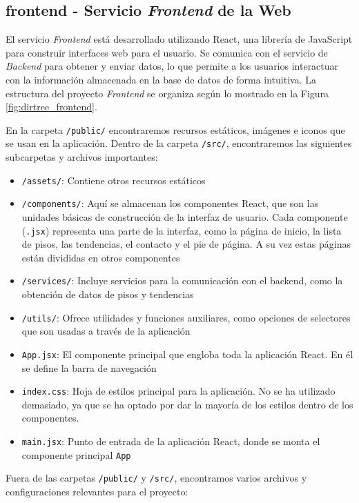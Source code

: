 \subsection{frontend - Servicio \textit{Frontend} de la Web}

El servicio \textit{Frontend} está desarrollado utilizando React, una librería de JavaScript para construir interfaces web para el usuario. Se comunica con el servicio de \textit{Backend} para obtener y enviar datos, lo que permite a los usuarios interactuar con la información almacenada en la base de datos de forma intuitiva. La estructura del proyecto \textit{Frontend} se organiza según lo mostrado en la Figura \ref{fig:dirtree_frontend}.

En la carpeta \texttt{/public/} encontraremos recursos estáticos, imágenes e iconos que se usan en la aplicación. Dentro de la carpeta \texttt{/src/}, encontraremos las siguientes subcarpetas y archivos importantes:

\begin{itemize}
    \item \texttt{/assets/}: Contiene otros recursos estáticos
    \item \texttt{/components/}: Aquí se almacenan los componentes React, que son las unidades básicas de construcción de la interfaz de usuario. Cada componente (\texttt{.jsx}) representa una parte de la interfaz, como la página de inicio, la lista de pisos, las tendencias, el contacto y el pie de página. A su vez estas páginas están divididas en otros componentes
    \item \texttt{/services/}: Incluye servicios para la comunicación con el backend, como la obtención de datos de pisos y tendencias
    \item \texttt{/utils/}: Ofrece utilidades y funciones auxiliares, como opciones de selectores que son usadas a través de la aplicación
    \item \texttt{App.jsx}: El componente principal que engloba toda la aplicación React. En él se define la barra de navegación
    \item \texttt{index.css}: Hoja de estilos principal para la aplicación. No se ha utilizado demasiado, ya que se ha optado por dar la mayoría de los estilos dentro de los componentes.
    \item \texttt{main.jsx}: Punto de entrada de la aplicación React, donde se monta el componente principal \texttt{App}
\end{itemize}

Fuera de las carpetas \texttt{/public/} y \texttt{/src/}, encontramos varios archivos y configuraciones relevantes para el proyecto:

